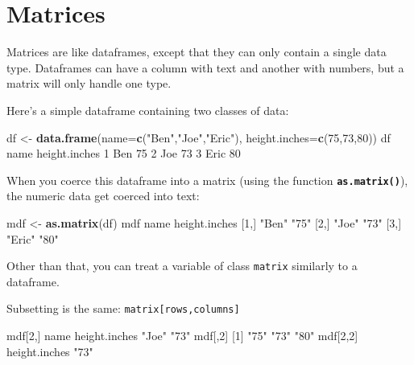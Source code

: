 \documentclass[]{book}
\newenvironment{Shaded}{\begin{snugshade}}{\end{snugshade}}
\newcommand{\DataTypeTok}[1]{\textcolor[rgb]{0.13,0.29,0.53}{#1}}
\newcommand{\DecValTok}[1]{\textcolor[rgb]{0.00,0.00,0.81}{#1}}
\newcommand{\KeywordTok}[1]{\textcolor[rgb]{0.13,0.29,0.53}{\textbf{#1}}}
\newcommand{\NormalTok}[1]{#1}
\newcommand{\StringTok}[1]{\textcolor[rgb]{0.31,0.60,0.02}{#1}}
\begin{document}
\hypertarget{matrices}{%
\section*{Matrices}\label{matrices}}

Matrices are like dataframes, except that they can only contain a single data type. Dataframes can have a column with text and another with numbers, but a matrix will only handle one type.

Here's a simple dataframe containing two classes of data:

\begin{Shaded}
\begin{Highlighting}[]
\NormalTok{df <-}\StringTok{ }\KeywordTok{data.frame}\NormalTok{(}\DataTypeTok{name=}\KeywordTok{c}\NormalTok{(}\StringTok{"Ben"}\NormalTok{,}\StringTok{"Joe"}\NormalTok{,}\StringTok{"Eric"}\NormalTok{),}
                 \DataTypeTok{height.inches=}\KeywordTok{c}\NormalTok{(}\DecValTok{75}\NormalTok{,}\DecValTok{73}\NormalTok{,}\DecValTok{80}\NormalTok{))}
\NormalTok{df}
\NormalTok{  name height.inches}
\DecValTok{1}\NormalTok{  Ben            }\DecValTok{75}
\DecValTok{2}\NormalTok{  Joe            }\DecValTok{73}
\DecValTok{3}\NormalTok{ Eric            }\DecValTok{80}
\end{Highlighting}
\end{Shaded}

When you coerce this dataframe into a matrix (using the function \textbf{\texttt{as.matrix()}}), the numeric data get coerced into text:

\begin{Shaded}
\begin{Highlighting}[]
\NormalTok{mdf <-}\StringTok{ }\KeywordTok{as.matrix}\NormalTok{(df)}
\NormalTok{mdf}
\NormalTok{     name   height.inches}
\NormalTok{[}\DecValTok{1}\NormalTok{,] }\StringTok{"Ben"}  \StringTok{"75"}         
\NormalTok{[}\DecValTok{2}\NormalTok{,] }\StringTok{"Joe"}  \StringTok{"73"}         
\NormalTok{[}\DecValTok{3}\NormalTok{,] }\StringTok{"Eric"} \StringTok{"80"}         
\end{Highlighting}
\end{Shaded}

Other than that, you can treat a variable of class \texttt{matrix} similarly to a dataframe.

Subsetting is the same: \texttt{matrix{[}rows,columns{]}}

\begin{Shaded}
\begin{Highlighting}[]
\NormalTok{mdf[}\DecValTok{2}\NormalTok{,]}
\NormalTok{         name height.inches }
        \StringTok{"Joe"}          \StringTok{"73"} 
\NormalTok{mdf[,}\DecValTok{2}\NormalTok{]}
\NormalTok{[}\DecValTok{1}\NormalTok{] }\StringTok{"75"} \StringTok{"73"} \StringTok{"80"}
\NormalTok{mdf[}\DecValTok{2}\NormalTok{,}\DecValTok{2}\NormalTok{]}
\NormalTok{height.inches }
         \StringTok{"73"} 
\end{Highlighting}
\end{Shaded}
\end{document}
